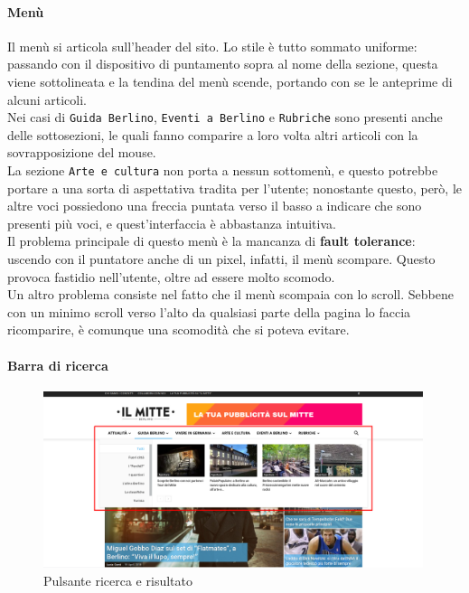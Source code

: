 \paragraph*{Menù}
Il menù si articola sull'header del sito. Lo stile è tutto sommato uniforme: passando con il dispositivo di puntamento sopra al nome della sezione, questa viene sottolineata e la tendina del menù scende, portando con se le anteprime di alcuni articoli. \\
Nei casi di \texttt{Guida Berlino}, \texttt{Eventi a Berlino} e \texttt{Rubriche} sono presenti anche delle sottosezioni, le quali fanno comparire a loro volta altri articoli con la sovrapposizione del mouse. \\
La sezione \texttt{Arte e cultura} non porta a nessun sottomenù, e questo potrebbe portare a una sorta di aspettativa tradita per l'utente; nonostante questo, però, le altre voci possiedono una freccia puntata verso il basso a indicare che sono presenti più voci, e quest'interfaccia è abbastanza intuitiva. \\
Il problema principale di questo menù è la mancanza di \textbf{fault tolerance}: uscendo con il puntatore anche di un pixel, infatti, il menù scompare. Questo provoca fastidio nell'utente, oltre ad essere molto scomodo. \\
Un altro problema consiste nel fatto che il menù scompaia con lo scroll. Sebbene con un minimo scroll verso l'alto da qualsiasi parte della pagina lo faccia ricomparire, è comunque una scomodità che si poteva evitare.

\paragraph*{Barra di ricerca}

\vspace{30pt}
\begin{figure}[htbp]
\begin{center}
\includegraphics[width=30em]{img/menu}
\caption{Pulsante ricerca e risultato}
\end{center}
\end{figure}
\vspace{30pt}

